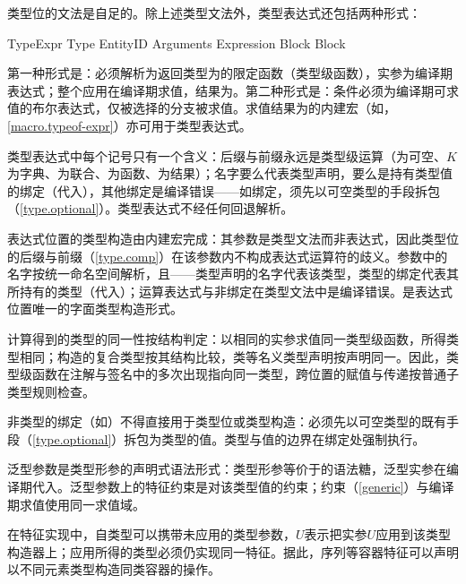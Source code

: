 \pnum
类型位的文法是自足的。除上述类型文法外，类型表达式还包括两种形式：

\begin{bnf}{TypeExpr}
    Type \br
    EntityID \terminal{(} Arguments\bnfq \terminal{)} \br
     Expression Block  Block
\end{bnf}

\pnum
第一种形式是：必须解析为返回类型为的限定函数（类型级函数），实参为编译期表达式；整个应用在编译期求值，结果为。第二种形式是：条件必须为编译期可求值的布尔表达式，仅被选择的分支被求值。求值结果为的内建宏（如，\ref{macro.typeof-expr}）亦可用于类型表达式。

\pnum
类型表达式中每个记号只有一个含义：后缀与前缀永远是类型级运算（为可空、\tcode{[}$K$\tcode{]}为字典、\tcode{|}为联合、\tcode{->}为函数、\tcode{!!}为结果）；名字要么代表类型声明，要么是持有类型值的绑定（代入），其他绑定是编译错误——如绑定，须先以可空类型的手段拆包（\ref{type.optional}）。类型表达式不经任何回退解析。

\pnum
表达式位置的类型构造由内建宏完成：其参数是类型文法而非表达式，因此类型位的后缀与前缀（\ref{type.comp}）在该参数内不构成表达式运算符的歧义。参数中的名字按统一命名空间解析，且——类型声明的名字代表该类型，类型的绑定代表其所持有的类型（代入）；运算表达式与非绑定在类型文法中是编译错误。是表达式位置唯一的字面类型构造形式。

\pnum
计算得到的类型的同一性按结构判定：以相同的实参求值同一类型级函数，所得类型相同；构造的复合类型按其结构比较，类等名义类型声明按声明同一。因此，类型级函数在注解与签名中的多次出现指向同一类型，跨位置的赋值与传递按普通子类型规则检查。

\pnum
非类型的绑定（如）不得直接用于类型位或类型构造：必须先以可空类型的既有手段（\ref{type.optional}）拆包为类型的值。类型与值的边界在绑定处强制执行。

\pnum
泛型参数是类型形参的声明式语法形式：类型形参等价于的语法糖，泛型实参在编译期代入。泛型参数上的特征约束是对该类型值的约束；约束（\ref{generic}）与编译期求值使用同一求值域。

\pnum
在特征实现中，自类型可以携带未应用的类型参数，$U$\tcode{>}表示把实参$U$应用到该类型构造器上；应用所得的类型必须仍实现同一特征。据此，序列等容器特征可以声明以不同元素类型构造同类容器的操作。

